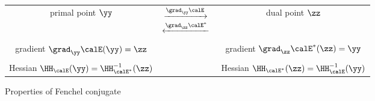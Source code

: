 \begin{figure}[H]
\begin{mdframed}
  \centering
\begin{center}
\begin{tabular}{ c c c }
 primal point $\yy$
  & $  \begin{matrix}
    \xrightarrow{\grad_{\yy} \calE }{} \\
     \xleftarrow{\grad_{\zz} \calE^* }{}
   \end{matrix}$ &
                   dual point $\zz$ \\
  \\
 gradient $\grad_{\yy} \calE(\yy) = \zz$  & & gradient $\grad_{\zz}
                                              \calE^*(\zz) = \yy$ \\
  \\
 Hessian $\HH_{\calE}(\yy) = \HH_{\calE^*}^{-1}(\zz) $ & & Hessian $\HH_{\calE^*}(\zz) = \HH_{\calE}^{-1}(\yy)$
\end{tabular}
\end{center}
  \caption{Properties of Fenchel conjugate}
  \label{fig:fenchel}
\end{mdframed}
\end{figure}

